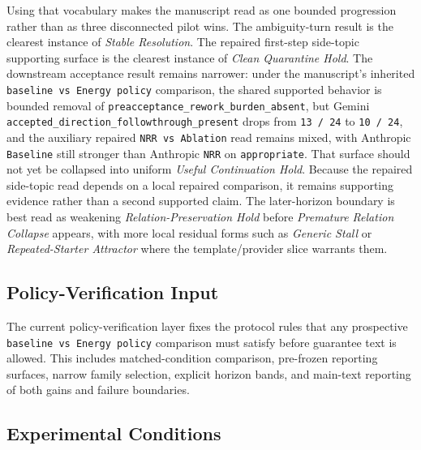 \documentclass[11pt]{article}
\begin{document}
Using that vocabulary makes the manuscript read as one bounded progression rather
than as three disconnected pilot wins. The ambiguity-turn result is the clearest
instance of \textit{Stable Resolution}. The repaired first-step side-topic
supporting surface is the clearest instance of \textit{Clean Quarantine Hold}.
The downstream
acceptance result remains narrower: under the manuscript's inherited
\texttt{baseline vs Energy policy} comparison, the shared supported behavior is
bounded removal of \texttt{preacceptance\_rework\_burden\_absent}, but Gemini
\texttt{accepted\_direction\_followthrough\_present} drops from
\texttt{13 / 24} to \texttt{10 / 24}, and the auxiliary repaired
\texttt{NRR vs Ablation} read remains mixed, with Anthropic \texttt{Baseline}
still stronger than Anthropic \texttt{NRR} on \texttt{appropriate}. That
surface should not yet be collapsed into uniform \textit{Useful Continuation
Hold}. Because the repaired side-topic read depends on a local repaired
comparison, it remains supporting evidence rather than a second supported
claim. The later-horizon boundary is best read as weakening
\textit{Relation-Preservation Hold} before \textit{Premature Relation Collapse}
appears, with more local residual forms such as \textit{Generic Stall} or
\textit{Repeated-Starter Attractor} where the template/provider slice warrants
them.

\subsection{Policy-Verification Input}

The current policy-verification layer fixes the protocol rules that any prospective
\texttt{baseline vs Energy policy} comparison must satisfy before guarantee text is
allowed. This includes matched-condition comparison, pre-frozen reporting
surfaces, narrow family selection, explicit horizon bands, and main-text
reporting of both gains and failure boundaries.

\subsection{Experimental Conditions}
\end{document}
